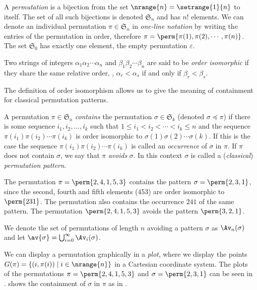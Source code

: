 A \emph{permutation} is a bijection from the set \(\nrange{n} = \setrange{1}{n}\) to itself. The
set of all such bijections is denoted \(\mathfrak{S}_n\) and has \(n!\) elements. We can
denote an individual permutation \(\pi\in\mathfrak{S}_n\) in \emph{one-line notation} by writing the
entries of the permutation in order, therefore \(\pi = \perm{\pi(1),\pi(2),\dotsm,\pi(n)}\). The
set \(\mathfrak{S}_0\) has exactly one element, the empty permutation \(\varepsilon\).

\begin{definition}
    Two strings of integers \(\alpha_1\alpha_2\dotsm\alpha_n\) and
    \(\beta_1\beta_2\dotsm\beta_n\) are said to be \emph{order isomorphic}
    if they share the same relative order, \ie, \(\alpha_r<\alpha_s\) if and
    only if \(\beta_r<\beta_s\).
\end{definition}

The definition of order isomorphism allows us to give the meaning of containment for classical
permutation patterns.
\begin{definition}
    A permutation \(\pi\in\mathfrak{S}_n\) \emph{contains} the permutation \(\sigma\in\mathfrak{S}_k\) (\mbox{denoted}
    \(\sigma \preceq \pi\)) if there is some sequence \( i_1,i_2,\dotsc,i_k\)
    such that \(1\le i_1<i_2<\dotsm<i_k\le n\) and the sequence \(\pi(i_1)\pi(i_2)\dotsm\pi(i_k)\) is order isomorphic to
    \(\sigma(1)\sigma(2)\dotsm\sigma(k)\). If this is the case the sequence
    \(\pi(i_1)\pi(i_2)\dotsm\pi(i_k)\) is called an \emph{occurrence} of \(\sigma\)
    in \(\pi\). If \(\pi\) does not contain \(\sigma\), we say that
    \(\pi\) \emph{avoids} \(\sigma\). In this context \(\sigma\) is called a (\emph{classical})
    \emph{permutation pattern}.
\end{definition}

\begin{example}
\label{ex:contexmpl}
The permutation \(\pi = \perm{2,4,1,5,3}\) contains the pattern
\(\sigma = \perm{2,3,1}\), since the second, fourth and fifth elements (\(453\)) are order
isomorphic to \(\perm{231}\). The permutation also contains the occurrence \(241\) of the same pattern. The permutation
\(\perm{2,4,1,5,3}\) avoids the pattern \(\perm{3,2,1}\).
\end{example}

We denote the set of permutations of length \(n\) avoiding a pattern \(\sigma\) as \(\Av_n(\sigma)\)
and let \(\av{\sigma}=\bigcup_{i=0}^{\infty}\Av_i(\sigma)\).

We can display a permutation graphically in a \emph{plot}, where we display the points
\(G(\pi) = \{(i,\pi(i))\mid i \in \nrange{n} \}\) in a Cartesian coordinate system. The plots of the permutations \(\pi =
\perm{2,4,1,5,3}\) and \(\sigma = \perm{2,3,1}\) can be seen in .
 shows the containment of \(\sigma\) in \(\pi\) as in .

